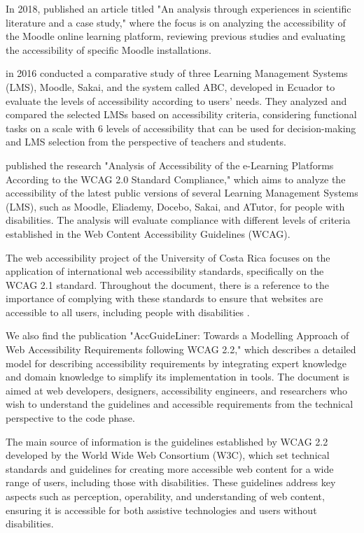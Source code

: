 \documentclass{IEEEtran}
\begin{document}
In 2018, \cite{Schiavone2018} published an article titled "An analysis through experiences in scientific literature and a case study," where the focus is on analyzing the accessibility of the Moodle online learning platform, reviewing previous studies and evaluating the accessibility of specific Moodle installations.

\cite{Acosta2016} in 2016 conducted a comparative study of three Learning Management Systems (LMS), Moodle, Sakai, and the system called ABC, developed in Ecuador to evaluate the levels of accessibility according to users' needs. They analyzed and compared the selected LMSs based on accessibility criteria, considering functional tasks on a scale with 6 levels of accessibility that can be used for decision-making and LMS selection from the perspective of teachers and students.

\cite{Bocevska2018} published the research "Analysis of Accessibility of the e-Learning Platforms According to the WCAG 2.0 Standard Compliance," which aims to analyze the accessibility of the latest public versions of several Learning Management Systems (LMS), such as Moodle, Eliademy, Docebo, Sakai, and ATutor, for people with disabilities. The analysis will evaluate compliance with different levels of criteria established in the Web Content Accessibility Guidelines (WCAG).

The web accessibility project of the University of Costa Rica focuses on the application of international web accessibility standards, specifically on the WCAG 2.1 standard. Throughout the document, there is a reference to the importance of complying with these standards to ensure that websites are accessible to all users, including people with disabilities \cite{DaSilva}.

We also find the publication "AccGuideLiner: Towards a Modelling Approach of Web Accessibility Requirements following WCAG 2.2," which describes a detailed model for describing accessibility requirements by integrating expert knowledge and domain knowledge to simplify its implementation in tools. The document is aimed at web developers, designers, accessibility engineers, and researchers who wish to understand the guidelines and accessible requirements from the technical perspective to the code phase.

The main source of information is the guidelines established by WCAG 2.2 developed by the World Wide Web Consortium (W3C), which set technical standards and guidelines for creating more accessible web content for a wide range of users, including those with disabilities. These guidelines address key aspects such as perception, operability, and understanding of web content, ensuring it is accessible for both assistive technologies and users without disabilities.
\end{document}
